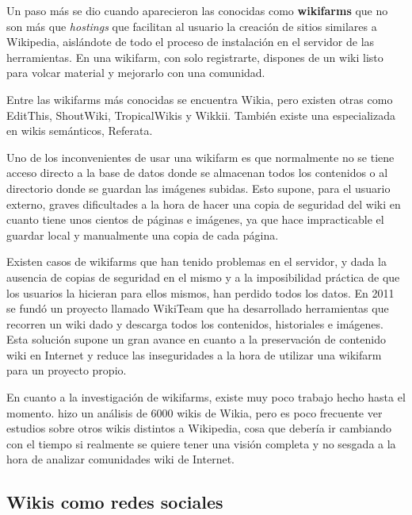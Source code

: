 \documentclass[11pt,onecolumn]{article}
\begin{document}
Un paso más se dio cuando aparecieron las conocidas como \textbf{wikifarms} que no son más que \emph{hostings} que facilitan al usuario la creación de sitios similares a Wikipedia, aislándote de todo el proceso de instalación en el servidor de las herramientas. En una wikifarm, con solo registrarte, dispones de un wiki listo para volcar material y mejorarlo con una comunidad.

Entre las wikifarms más conocidas se encuentra Wikia, pero existen otras como EditThis, ShoutWiki, TropicalWikis y Wikkii. También existe una especializada en wikis semánticos, Referata.

Uno de los inconvenientes de usar una wikifarm es que normalmente no se tiene acceso directo a la base de datos donde se almacenan todos los contenidos o al directorio donde se guardan las imágenes subidas. Esto supone, para el usuario externo, graves dificultades a la hora de hacer una copia de seguridad del wiki en cuanto tiene unos cientos de páginas e imágenes, ya que hace impracticable el guardar local y manualmente una copia de cada página.

Existen casos de wikifarms que han tenido problemas en el servidor, y dada la ausencia de copias de seguridad en el mismo y a la imposibilidad práctica de que los usuarios la hicieran para ellos mismos, han perdido todos los datos. En 2011 se fundó un proyecto llamado WikiTeam que ha desarrollado herramientas que recorren un wiki dado y descarga todos los contenidos, historiales e imágenes. Esta solución supone un gran avance en cuanto a la preservación de contenido wiki en Internet y reduce las inseguridades a la hora de utilizar una wikifarm para un proyecto propio.

En cuanto a la investigación de wikifarms, existe muy poco trabajo hecho hasta el momento. \citep{kittur2010} hizo un análisis de 6000 wikis de Wikia, pero es poco frecuente ver estudios sobre otros wikis distintos a Wikipedia, cosa que debería ir cambiando con el tiempo si realmente se quiere tener una visión completa y no sesgada a la hora de analizar comunidades wiki de Internet.

\subsection{Wikis como redes sociales}


\clearpage
\end{document}
